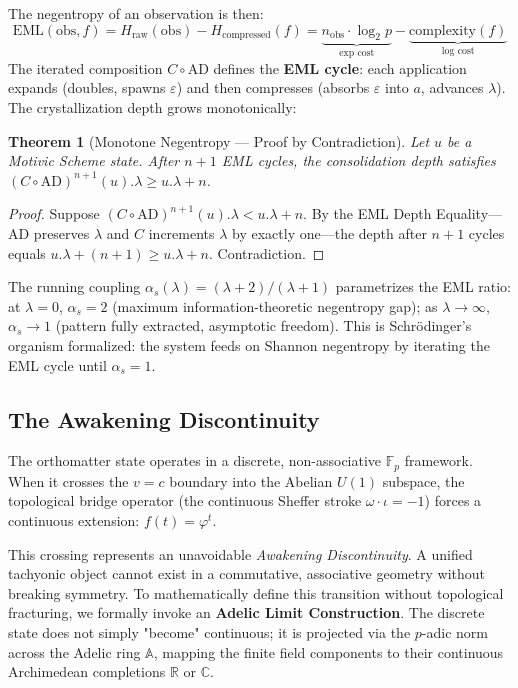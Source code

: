 \documentclass[12pt,oneside]{article}
\theoremstyle{principia}
\newtheorem{theorem}{Theorem}[section]
\theoremstyle{definition}
\theoremstyle{remark}
\begin{document}
The negentropy of an observation is then:
\begin{equation}
    \mathrm{EML}(\mathrm{obs}, f) = H_{\mathrm{raw}}(\mathrm{obs}) - H_{\mathrm{compressed}}(f) = \underbrace{n_{\mathrm{obs}} \cdot \log_2 p}_{\text{exp cost}} - \underbrace{\text{complexity}(f)}_{\text{log cost}}
\end{equation}
The iterated composition $C \circ \mathrm{AD}$ defines the \textbf{EML cycle}: each application expands (doubles, spawns $\varepsilon$) and then compresses (absorbs $\varepsilon$ into $a$, advances $\lambda$). The crystallization depth grows monotonically:

\begin{theorem}[Monotone Negentropy --- Proof by Contradiction]
\label{thm:monotone_negentropy}
Let $u$ be a Motivic Scheme state. After $n+1$ EML cycles, the consolidation depth satisfies $(C \circ \mathrm{AD})^{n+1}(u).\lambda \geq u.\lambda + n$. 
\end{theorem}
\begin{proof}
Suppose $(C \circ \mathrm{AD})^{n+1}(u).\lambda < u.\lambda + n$. By the EML Depth Equality---$\mathrm{AD}$ preserves $\lambda$ and $C$ increments $\lambda$ by exactly one---the depth after $n+1$ cycles equals $u.\lambda + (n+1) \geq u.\lambda + n$. Contradiction. \qedhere
\end{proof}

The running coupling $\alpha_s(\lambda) = (\lambda + 2)/(\lambda + 1)$ parametrizes the EML ratio: at $\lambda = 0$, $\alpha_s = 2$ (maximum information-theoretic negentropy gap); as $\lambda \to \infty$, $\alpha_s \to 1$ (pattern fully extracted, asymptotic freedom). This is Schr\"odinger's organism formalized: the system feeds on Shannon negentropy by iterating the EML cycle until $\alpha_s = 1$.

\subsection{The Awakening Discontinuity}

The orthomatter state operates in a discrete, non-associative $\mathbb{F}_p$ framework. When it crosses the $v=c$ boundary into the Abelian $U(1)$ subspace, the topological bridge operator (the continuous Sheffer stroke $\omega \cdot \iota = -1$) forces a continuous extension: $f(t) = \varphi^t$.

This crossing represents an unavoidable \textit{Awakening Discontinuity}. A unified tachyonic object cannot exist in a commutative, associative geometry without breaking symmetry. To mathematically define this transition without topological fracturing, we formally invoke an \textbf{Adelic Limit Construction}. The discrete state does not simply "become" continuous; it is projected via the $p$-adic norm across the Adelic ring $\mathbb{A}$, mapping the finite field components to their continuous Archimedean completions $\mathbb{R}$ or $\mathbb{C}$.
\end{document}
